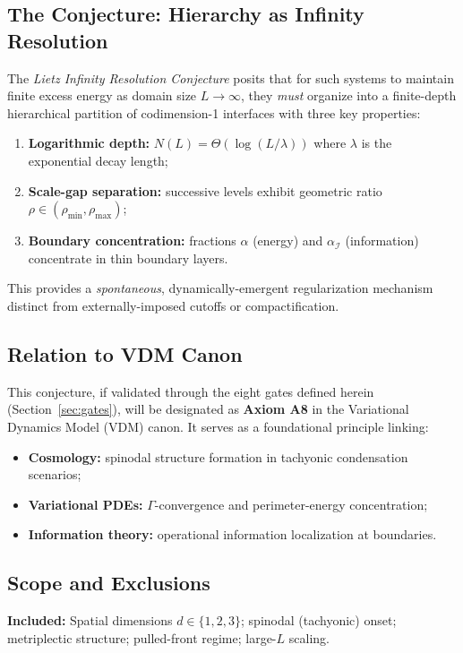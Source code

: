 \documentclass{article}
\begin{document}
\subsection{The Conjecture: Hierarchy as Infinity Resolution}

The \emph{Lietz Infinity Resolution Conjecture} posits that for such systems to maintain finite excess energy as domain size $L\to\infty$, they \emph{must} organize into a finite-depth hierarchical partition of codimension-1 interfaces with three key properties:
\begin{enumerate}
    \item \textbf{Logarithmic depth:} $N(L) = \Theta(\log(L/\lambda))$ where $\lambda$ is the exponential decay length;
    \item \textbf{Scale-gap separation:} successive levels exhibit geometric ratio $\rho\in(\rho_{\min},\rho_{\max})$;
    \item \textbf{Boundary concentration:} fractions $\alpha$ (energy) and $\alpha_\mathcal{I}$ (information) concentrate in thin boundary layers.
\end{enumerate}
This provides a \emph{spontaneous}, dynamically-emergent regularization mechanism distinct from externally-imposed cutoffs or compactification.

\subsection{Relation to VDM Canon}

This conjecture, if validated through the eight gates defined herein (Section~\ref{sec:gates}), will be designated as \textbf{Axiom A8} in the Variational Dynamics Model (VDM) canon. It serves as a foundational principle linking:
\begin{itemize}
    \item \textbf{Cosmology:} spinodal structure formation in tachyonic condensation scenarios;
    \item \textbf{Variational PDEs:} $\Gamma$-convergence and perimeter-energy concentration;
    \item \textbf{Information theory:} operational information localization at boundaries.
\end{itemize}

\subsection{Scope and Exclusions}

\textbf{Included:} Spatial dimensions $d\in\{1,2,3\}$; spinodal (tachyonic) onset; metriplectic structure; pulled-front regime; large-$L$ scaling.
\end{document}
